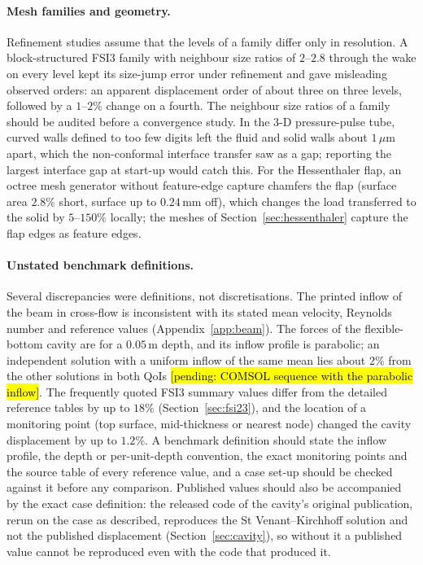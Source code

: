 \paragraph{Mesh families and geometry.}
Refinement studies assume that the levels of a family differ only in resolution.
A block-structured FSI3 family with neighbour size ratios of $2$--$2.8$ through the wake on every level kept its size-jump error under refinement and gave misleading observed orders: an apparent displacement order of about three on three levels, followed by a $1$--$2\%$ change on a fourth. The neighbour size ratios of a family should be audited before a convergence study.
In the 3-D pressure-pulse tube, curved walls defined to too few digits left the fluid and solid walls about $1\,\mu\mathrm{m}$ apart, which the non-conformal interface transfer saw as a gap; reporting the largest interface gap at start-up would catch this.
For the Hessenthaler flap, an octree mesh generator without feature-edge capture chamfers the flap (surface area $2.8\%$ short, surface up to $0.24\,\mathrm{mm}$ off), which changes the load transferred to the solid by $5$--$150\%$ locally; the meshes of Section~\ref{sec:hessenthaler} capture the flap edges as feature edges.

\paragraph{Unstated benchmark definitions.}
Several discrepancies were definitions, not discretisations.
The printed inflow of the beam in cross-flow is inconsistent with its stated mean velocity, Reynolds number and reference values (Appendix~\ref{app:beam}).
The forces of the flexible-bottom cavity are for a $0.05\,\mathrm{m}$ depth, and its inflow profile is parabolic; an independent solution with a uniform inflow of the same mean lies about $2\%$ from the other solutions in both QoIs \hl{[pending: COMSOL sequence with the parabolic inflow]}.
The frequently quoted FSI3 summary values differ from the detailed reference tables by up to $18\%$ (Section~\ref{sec:fsi23}), and the location of a monitoring point (top surface, mid-thickness or nearest node) changed the cavity displacement by up to $1.2\%$.
A benchmark definition should state the inflow profile, the depth or per-unit-depth convention, the exact monitoring points and the source table of every reference value, and a case set-up should be checked against it before any comparison.
Published values should also be accompanied by the exact case definition: the released code of the cavity's original publication, rerun on the case as described, reproduces the St Venant--Kirchhoff solution and not the published displacement (Section~\ref{sec:cavity}), so without it a published value cannot be reproduced even with the code that produced it.
